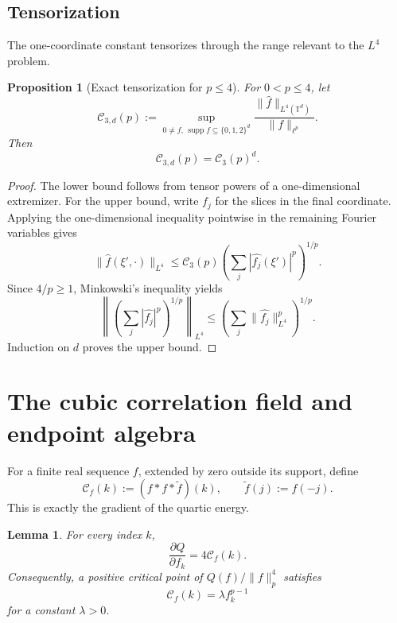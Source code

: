 \documentclass[11pt,reqno]{amsart}
\numberwithin{equation}{section}
\newtheorem{proposition}[proposition]{Proposition}
\newtheorem{lemma}[lemma]{Lemma}
\theoremstyle{definition}
\theoremstyle{remark}
\newcommand{\T}{\mathbb T}
\newcommand{\supp}{\operatorname{supp}}
\newcommand{\norm}[1]{\lVert #1\rVert}
\newcommand{\cC}{\mathcal C}
\newcommand{\rev}{\widetilde}
\begin{document}
\subsection{Tensorization}

The one-coordinate constant tensorizes through the range relevant to the
$L^4$ problem.

\begin{proposition}[Exact tensorization for $p\le4$]\label{prop:tensorization}
For $0<p\le4$, let
\[
  \cC_{3,d}(p):=
  \sup_{0\ne f,\,\supp f\subseteq\{0,1,2\}^d}
  \frac{\norm{\widehat f}_{L^4(\T^d)}}{\norm f_{\ell^p}}.
\]
Then
\begin{equation}\label{eq:tensorization}
  \cC_{3,d}(p)=\cC_3(p)^d.
\end{equation}
\end{proposition}

\begin{proof}
The lower bound follows from tensor powers of a one-dimensional extremizer.
For the upper bound, write $f_j$ for the slices in the final coordinate.
Applying the one-dimensional inequality pointwise in the remaining Fourier
variables gives
\[
  \norm{\widehat f(\xi',\cdot)}_{L^4}
  \le\cC_3(p)
  \left(\sum_j|\widehat{f_j}(\xi')|^p\right)^{1/p}.
\]
Since $4/p\ge1$, Minkowski's inequality yields
\[
  \left\|
  \left(\sum_j|\widehat{f_j}|^p\right)^{1/p}
  \right\|_{L^4}
  \le
  \left(\sum_j\norm{\widehat{f_j}}_{L^4}^p\right)^{1/p}.
\]
Induction on $d$ proves the upper bound.
\end{proof}

\section{The cubic correlation field and endpoint algebra}

For a finite real sequence $f$, extended by zero outside its support, define
\begin{equation}\label{eq:cubic-field}
  \cC_f(k):=(f*f*\rev f)(k),
  \qquad \rev f(j):=f(-j).
\end{equation}
This is exactly the gradient of the quartic energy.

\begin{lemma}\label{lem:gradient}
For every index $k$,
\begin{equation}\label{eq:gradient}
  \frac{\partial Q}{\partial f_k}=4\cC_f(k).
\end{equation}
Consequently, a positive critical point of $Q(f)/\norm f_p^4$ satisfies
\begin{equation}\label{eq:EL}
  \cC_f(k)=\lambda f_k^{p-1}
\end{equation}
for a constant $\lambda>0$.
\end{lemma}
\end{document}
